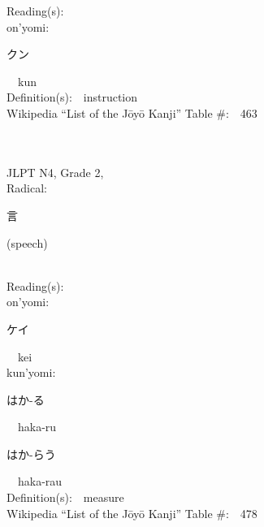 \begin{multicols}{2}
Reading(s):\ \ \\
{\hspace*{1em}}on'yomi:\ \ \\
{\hspace*{2em}}{\begin{CJK}{UTF8}{min} クン \end{CJK}}\ \ kun\ \ \\
Definition(s):\ \ instruction \\
Wikipedia ``List of the J\=oy\=o Kanji'' Table \#:\ \ 463 \\
\ \ \\
{\fontsize{34pt}{40pt}  }\ \ \\  %
{JLPT N4, Grade 2, \\Radical:\ \ {\begin{CJK}{UTF8}{min} 言 \end{CJK}} (speech) } \\
Reading(s):\ \ \\
{\hspace*{1em}}on'yomi:\ \ \\
{\hspace*{2em}}{\begin{CJK}{UTF8}{min} ケイ \end{CJK}}\ \ kei\ \ \\
{\hspace*{1em}}kun'yomi:\ \ \\
{\hspace*{2em}}{\begin{CJK}{UTF8}{min} はか-る \end{CJK}}\ \ haka-ru\ \ \\
{\hspace*{2em}}{\begin{CJK}{UTF8}{min} はか-らう \end{CJK}}\ \ haka-rau\ \ \\
Definition(s):\ \ measure \\
Wikipedia ``List of the J\=oy\=o Kanji'' Table \#:\ \ 478 \\
\ \ \\
{\fontsize{34pt}{40pt}  }\ \ \\  %

\end{multicols}
